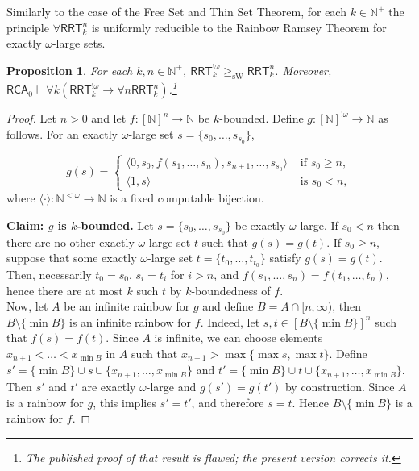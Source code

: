 \documentclass{article}
\newcommand{\RCA}[0]{\mathsf{RCA}}
\newcommand{\RRT}[0]{\mathsf{RRT}}
\newcommand{\NN}[0]{\mathbb{N}}
\newcommand{\sW}{\mathrm{sW}}
\numberwithin{theorem}{section}
\newtheorem{proposition}[theorem]{Proposition}
\newcommand{\ludovic}[1]{\textcolor{blue}{#1}}
\newcommand{\lorenzo}[1]{\textcolor{orange}{#1}}
\begin{document}
Similarly to the case of the Free Set and Thin Set Theorem, for each $k\in\NN^+$ the principle $\forall \RRT^n_k$ is uniformly reducible to the Rainbow Ramsey Theorem for 
exactly $\omega$-large sets. 
\fi

\begin{proposition}
For each $k, n\in\NN^+$, $\RRT^{!\omega}_k \geq_\sW \RRT^n_k$.
Moreover, $\RCA_0 \vdash \forall k (\RRT^{!\omega}_k \to \forall n \RRT^n_k)$.\footnote{The published proof \cite{carlucci2025ramsey} of that result is flawed; the present version corrects it.}
\end{proposition}

\begin{proof}
Let $n > 0$ and let $f:[\NN]^n \to \NN$ be $k$-bounded. Define $g:[\NN]^{!\omega}\to \NN$ as follows. For an exactly $\omega$-large set $s = \{s_0, \dots, s_{s_0}\}$,

$$
g(s)=
\begin{cases}
\langle 0, s_0, f(s_1, \dots, s_n), s_{n+1}, \dots, s_{s_0} \rangle & \mbox{ if } s_0 \geq n,\\
\langle 1, s \rangle & \mbox{ is } s_0 < n,
\end{cases}
$$
where $\langle \cdot \rangle : \NN^{<\omega} \to \NN$ is a fixed computable bijection.

\textbf{Claim: $g$ is $k$-bounded.} Let $s = \{s_0, \dots, s_{s_0}\}$ be exactly $\omega$-large. If $s_0 < n$ then there are no other exactly $\omega$-large set $t$ such that $g(s) = g(t)$. If $s_0 \geq n$, suppose that some exactly $\omega$-large set $t = \{t_0, \dots, t_{t_0}\}$ satisfy $g(s) = g(t)$. Then, necessarily $t_0 = s_0$, $s_i = t_i$ for $i > n$, and $f(s_1, \dots, s_n) = f(t_1, \dots, t_n)$, hence there are at most $k$ such $t$ by $k$-boundedness of $f$. \\


Now, let $A$ be an infinite rainbow for $g$ and define $B = A \cap [n, \infty)$, then $B \setminus \{\min B\}$ is an infinite rainbow for $f$. Indeed, let $s,t \in [B \setminus \{\min B\}]^n$ such that $f(s) = f(t)$. Since $A$ is infinite, we can choose elements $x_{n+1} < \dots < x_{\min B}$ in $A$ such that $x_{n+1} > \max \{\max s, \max t\}$. Define $s' = \{\min B\} \cup s \cup \{x_{n+1}, \dots, x_{\min B}\}$ and $t' = \{\min B\} \cup t \cup \{x_{n+1}, \dots, x_{\min B}\}$. Then $s'$ and $t'$ are exactly $\omega$-large and $g(s') = g(t')$ by construction. Since $A$ is a rainbow for $g$, this implies $s' = t'$, and therefore $s = t$. Hence $B \setminus \{\min B\}$ is a rainbow for $f$.
\end{proof}
\end{document}
